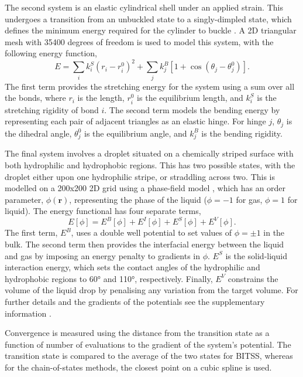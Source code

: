 \documentclass[aps,prl,twocolumn,10pt,groupedaddress]{revtex4-2}
\begin{document}
The second system is an elastic cylindrical shell under an applied strain.
This undergoes a transition from an unbuckled state to a singly-dimpled state, which defines the minimum energy required for the cylinder to buckle \cite{Panter2019}.
A 2D triangular mesh with 35400 degrees of freedom is used to model this system, with the following energy function,
\begin{equation}
  E = \sum_i k^S_i (r_i - r^0_i)^2 + \sum_j k^B_j [1 + \cos(\theta_j - \theta^0_j)].
\end{equation}
The first term provides the stretching energy for the system using a sum over all the bonds, where $r_i$ is the length, $r^0_i$ is the equilibrium length, and $k^S_i$ is the stretching rigidity of bond $i$.
The second term models the bending energy by representing each pair of adjacent triangles as an elastic hinge.
For hinge $j$, $\theta_j$ is the dihedral angle, $\theta^0_j$ is the equilibrium angle, and $k^B_j$ is the bending rigidity.

The final system involves a droplet situated on a chemically striped surface with both hydrophilic and hydrophobic regions.
This has two possible states, with the droplet either upon one hydrophilic stripe, or straddling across two.
This is modelled on a 200x200 2D grid using a phase-field model \cite{Panter2019b}, which has an order parameter, $\phi(\bm{r})$, representing the phase of the liquid ($\phi=-1$ for gas, $\phi=1$ for liquid).
The energy functional has four separate terms,
\begin{equation} \label{eq:phasefield}
  E[\phi] = E^B[\phi] + E^I[\phi] + E^S[\phi] + E^V[\phi].
\end{equation}
The first term, $E^B$, uses a double well potential to set values of $\phi=\pm1$ in the bulk.
The second term then provides the interfacial energy between the liquid and gas by imposing an energy penalty to gradients in $\phi$.
$E^S$ is the solid-liquid interaction energy, which sets the contact angles of the hydrophilic and hydrophobic regions to 60\si{\degree} and 110\si{\degree}, respectively.
Finally, $E^V$ constrains the volume of the liquid drop by penalising any variation from the target volume.
For further details and the gradients of the potentials see the supplementary information \cite{Note1}.

Convergence is measured using the distance from the transition state as a function of number of evaluations to the gradient of the system's potential.
The transition state is compared to the average of the two states for BITSS, whereas for the chain-of-states methods, the closest point on a cubic spline is used.
\end{document}
